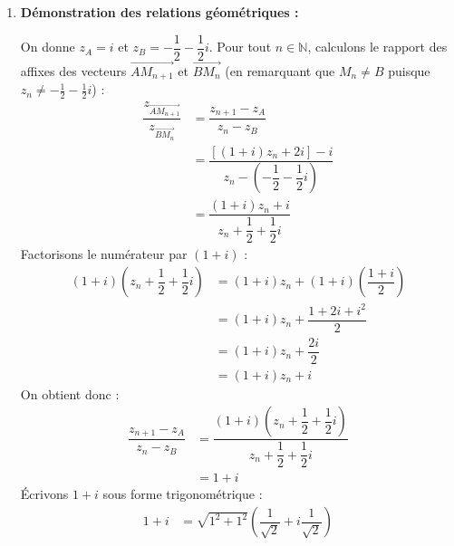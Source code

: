 \documentclass[12pt,a4paper]{article}
\begin{document}
\begin{enumerate}
\begin{enumerate}
        \item \textbf{Expression de $z_n$ en fonction de $n$ :}
        
        Puisque $u_n = z_n + 2$, on a $z_n = u_n - 2$, soit pour tout $n \in \mathbb{N}$ :
        $$
        \begin{aligned}
            z_n &= (2 + i)(1 + i)^n - 2
        \end{aligned}
        $$
    \end{enumerate}

    \item \textbf{Démonstration des relations géométriques :}
    
    On donne $z_A = i$ et $z_B = -\dfrac{1}{2} - \dfrac{1}{2}i$. Pour tout $n \in \mathbb{N}$, calculons le rapport des affixes des vecteurs $\overrightarrow{AM_{n+1}}$ et $\overrightarrow{BM_n}$ (en remarquant que $M_n \neq B$ puisque $z_n \neq -\frac{1}{2} - \frac{1}{2}i$) :
    $$
    \begin{aligned}
        \dfrac{z_{\overrightarrow{AM_{n+1}}}}{z_{\overrightarrow{BM_n}}} &= \dfrac{z_{n+1} - z_A}{z_n - z_B} \\
        &= \dfrac{\left[(1 + i)z_n + 2i\right] - i}{z_n - \left(-\dfrac{1}{2} - \dfrac{1}{2}i\right)} \\
        &= \dfrac{(1 + i)z_n + i}{z_n + \dfrac{1}{2} + \dfrac{1}{2}i}
    \end{aligned}
    $$
    Factorisons le numérateur par $(1 + i)$ :
    $$
    \begin{aligned}
        (1 + i)\left(z_n + \dfrac{1}{2} + \dfrac{1}{2}i\right) &= (1 + i)z_n + (1 + i)\left(\dfrac{1 + i}{2}\right) \\
        &= (1 + i)z_n + \dfrac{1 + 2i + i^2}{2} \\
        &= (1 + i)z_n + \dfrac{2i}{2} \\
        &= (1 + i)z_n + i
    \end{aligned}
    $$
    On obtient donc :
    $$
    \begin{aligned}
        \dfrac{z_{n+1} - z_A}{z_n - z_B} &= \dfrac{(1 + i)\left(z_n + \dfrac{1}{2} + \dfrac{1}{2}i\right)}{z_n + \dfrac{1}{2} + \dfrac{1}{2}i} \\
        &= 1 + i
    \end{aligned}
    $$
    Écrivons $1 + i$ sous forme trigonométrique :
    $$
    \begin{aligned}
        1 + i &= \sqrt{1^2 + 1^2}\left( \dfrac{1}{\sqrt{2}} + i\dfrac{1}{\sqrt{2}} \right) \\

\end{aligned}$$
\end{enumerate}
\end{document}
